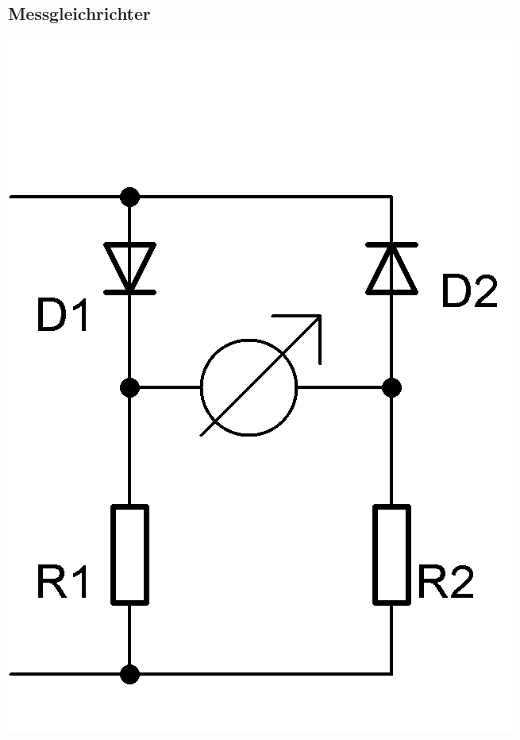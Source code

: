 \begin{frame}
	\frametitle{Messgleichrichter}
	\begin{center}
	\includegraphics[scale=1.2]{a16/Messgleichrichter1.png}
	\hspace{3mm}

\end{center}
\end{frame}
